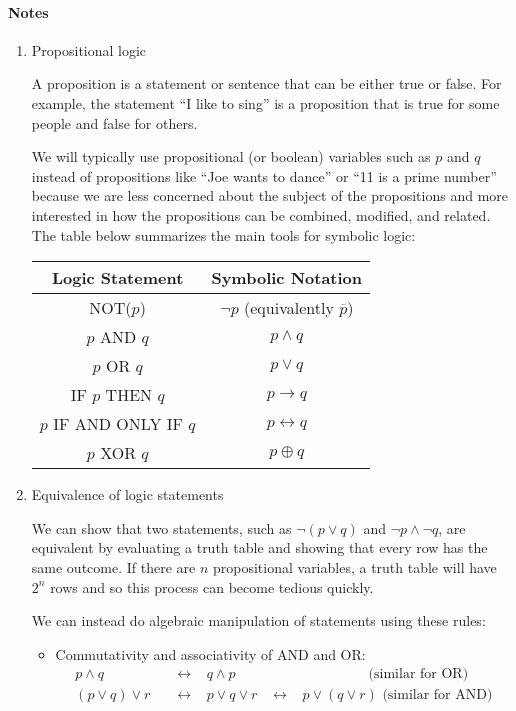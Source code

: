 \documentclass[12pt]{article}
\begin{document}
\paragraph*{Notes}
\begin{enumerate}

\item Propositional logic

A proposition is a statement or sentence that can be either true or false. For example, the statement ``I like to sing'' is a proposition that is true for some people and false for others.

We will typically use propositional (or boolean) variables such as $p$ and $q$ instead of propositions like ``Joe wants to dance'' or ``11 is a prime number'' because we are less concerned about the subject of the propositions and more interested in how the propositions can be combined, modified, and related. The table below summarizes the main tools for symbolic logic:
\begin{center}
\begin{tabular}{c | c }
	Logic Statement & Symbolic Notation \\ \hline
	NOT($p$) & $\neg p$ (equivalently $\overline{p}$) \\
	$p$ AND $q$ & $p \wedge q$ \\
	$p$ OR $q$ & $p \vee q$ \\
	IF $p$ THEN $q$ & $p \rightarrow q$ \\
	$p$ IF AND ONLY IF $q$ & $p \leftrightarrow q$ \\
	$p$ XOR $q$ & $p \oplus q$
\end{tabular}
\end{center}

\item Equivalence of logic statements

We can show that two statements, such as $\neg (p \vee q)$ and $\neg p \wedge \neg q$, are equivalent by evaluating a truth table and showing that every row has the same outcome. If there are $n$ propositional variables, a truth table will have $2^n$ rows and so this process can become tedious quickly.

We can instead do algebraic manipulation of statements using these rules:
\begin{itemize}
	\item Commutativity and associativity of AND and OR:
	\begin{align*}
		p \wedge q \;\;\; &\leftrightarrow \;\;\; q \wedge p \;\;\; \;\;\; \;\;\; \;\;\; \;\;\; \;\;\; \;\;\; \;\;\; \;\;\; \;\;\; \;\;\;  \text{ (similar for OR)}\\
		(p \vee q) \vee r \;\;\; &\leftrightarrow \;\;\; p \vee q \vee r \;\;\; \leftrightarrow \;\;\; p \vee (q \vee r) \text{ (similar for AND)}
	\end{align*}
	

\end{itemize}
\end{enumerate}
\end{document}
